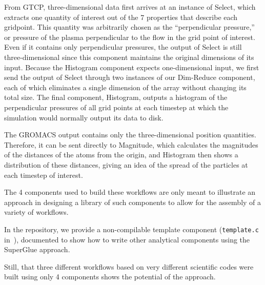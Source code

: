 From GTCP, three-dimensional data first
arrives at an instance of Select, which extracts
one quantity of interest out of the 7 properties that describe each gridpoint.
This quantity was arbitrarily chosen as the ``perpendicular
pressure,'' or pressure of the plasma perpendicular to the flow in the grid
point of interest. Even if it contains only perpendicular pressures, the output
of Select is still three-dimensional since this component maintains the
original dimensions of its input. Because the Histogram component expects
one-dimensional input, we first send the output of Select through two instances
of our Dim-Reduce component, each of which eliminates a single dimension of the
array without changing its total size. The final component, Histogram, outputs
a histogram of the perpendicular pressures of all grid points at each timestep
at which the simulation would normally output its data to disk.

The GROMACS output
contains only the three-dimensional
position quantities.
Therefore, it can be sent directly to
Magnitude, which calculates
the magnitudes of the distances of the atoms from
the origin, and Histogram then shows a distribution
of these distances, giving an idea of the spread
of the particles at each timestep of interest.

The 4 components used to build these workflows
are only meant to illustrate an approach
in designing a library of such components
to allow for the assembly of a variety of workflows.

In the repository, we provide a non-compilable
template component
(\verb|template.c| in~\cite{champsaur:superglue-repo}),
documented to show
how to write other analytical
components using the SuperGlue approach.

Still, that three different workflows based
on very different scientific codes were built using
only 4 components shows the potential of the approach.
